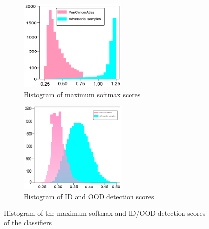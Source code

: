 \begin{figure}[h]
	\centering
	\begin{subfigure}{.48\linewidth}
		\centering
		\includegraphics[width=0.95\linewidth,height=45mm]{images/ood_detection.png}
		\caption{Histogram of maximum softmax scores}
        \label{fig:max_soft_score}
	\end{subfigure}
	\begin{subfigure}{0.48\linewidth}
		\centering
		\includegraphics[width=0.95\linewidth,height=45mm]{images/hist_max_softmax.png}
		\caption{Histogram of ID and OOD detection scores}
		\label{fig:id_ood_de_scores}
	\end{subfigure}
	\caption{Histogram of the maximum softmax and ID/OOD detection scores of the classifiers} 
	\label{fig:max_soft_scores_and_de_scores}
\end{figure}

